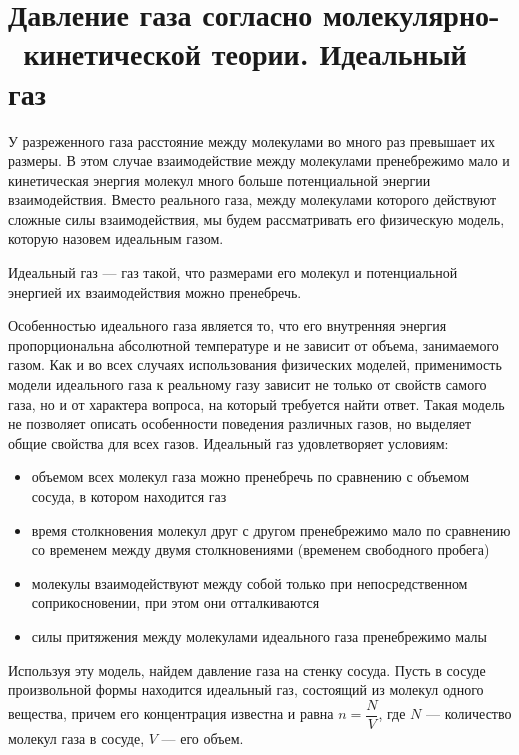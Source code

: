 \section{Давление газа согласно молекулярно- \, кинетической теории. Идеальный газ}
У разреженного газа расстояние между молекулами во много раз превышает их размеры. В этом случае взаимодействие между молекулами пренебрежимо мало и кинетическая энергия молекул много больше потенциальной энергии взаимодействия. Вместо реального газа, между молекулами которого действуют сложные силы взаимодействия, мы будем рассматривать его физическую модель, которую назовем идеальным газом. 
\begin{defn}
	Идеальный газ --- газ такой, что размерами его молекул и потенциальной энергией их взаимодействия можно пренебречь.
\end{defn}
Особенностью идеального газа является то, что его внутренняя энергия пропорциональна абсолютной температуре и не зависит от объема, занимаемого газом. Как и во всех случаях использования физических моделей, применимость модели идеального газа к реальному газу зависит не только от свойств самого газа, но и от характера вопроса, на который требуется найти ответ. Такая модель не позволяет описать особенности поведения различных газов, но выделяет общие свойства для всех газов. Идеальный газ удовлетворяет условиям:
\begin{itemize}
	\item объемом всех молекул газа можно пренебречь по сравнению с объемом сосуда, в котором находится газ
	\item время столкновения молекул друг с другом пренебрежимо мало по сравнению со временем между двумя столкновениями (временем свободного пробега)
	\item молекулы взаимодействуют между собой только при непосредственном соприкосновении, при этом они отталкиваются
	\item силы притяжения между молекулами идеального газа пренебрежимо малы
\end{itemize}
Используя эту модель, найдем давление газа на стенку сосуда. Пусть в сосуде произвольной формы находится идеальный газ, состоящий из молекул одного вещества, причем его концентрация известна и равна $n=\dfrac{N}{V}$, где $N$ --- количество молекул газа в сосуде, $V$ --- его объем.